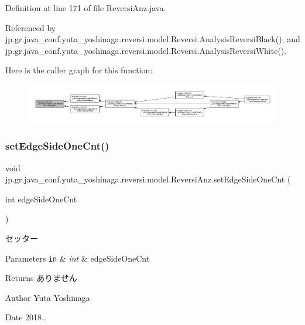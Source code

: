 Definition at line 171 of file Reversi\+Anz.\+java.



Referenced by jp.\+gr.\+java\+\_\+conf.\+yuta\+\_\+yoshinaga.\+reversi.\+model.\+Reversi.\+Analysis\+Reversi\+Black(), and jp.\+gr.\+java\+\_\+conf.\+yuta\+\_\+yoshinaga.\+reversi.\+model.\+Reversi.\+Analysis\+Reversi\+White().

Here is the caller graph for this function\+:
\nopagebreak
\begin{figure}[H]
\begin{center}
\leavevmode
\includegraphics[width=350pt]{classjp_1_1gr_1_1java__conf_1_1yuta__yoshinaga_1_1reversi_1_1model_1_1_reversi_anz_aab3651918ed96bd47b03f79ff14f9bec_icgraph}
\end{center}
\end{figure}
\mbox{\label{classjp_1_1gr_1_1java__conf_1_1yuta__yoshinaga_1_1reversi_1_1model_1_1_reversi_anz_a126130b697a4306e782a539c8cea0a56}} 
\subsubsection{\texorpdfstring{set\+Edge\+Side\+One\+Cnt()}{setEdgeSideOneCnt()}}
{\footnotesize\ttfamily void jp.\+gr.\+java\+\_\+conf.\+yuta\+\_\+yoshinaga.\+reversi.\+model.\+Reversi\+Anz.\+set\+Edge\+Side\+One\+Cnt (\begin{DoxyParamCaption}\item[{int}]{edge\+Side\+One\+Cnt }\end{DoxyParamCaption})}



セッター 


\begin{DoxyParams}[1]{Parameters}
\mbox{\tt in}  & {\em int} & edge\+Side\+One\+Cnt \\
\hline
\end{DoxyParams}
\begin{DoxyReturn}{Returns}
ありません 
\end{DoxyReturn}
\begin{DoxyAuthor}{Author}
Yuta Yoshinaga 
\end{DoxyAuthor}
\begin{DoxyDate}{Date}
2018.. 
\end{DoxyDate}


